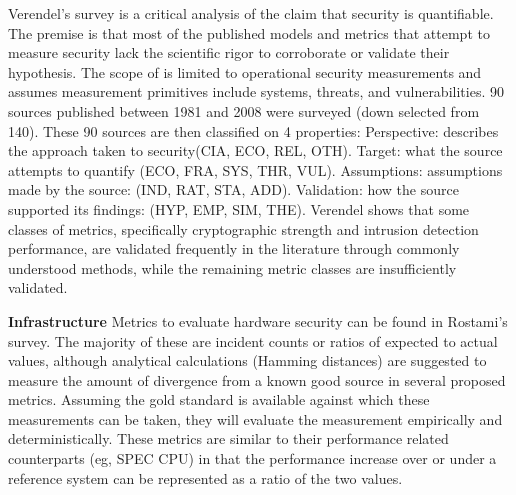 Verendel’s survey\cite{Verendel_2009} is a critical analysis of the claim that security is quantifiable. The premise is that most of the published models and metrics that attempt to measure security lack the scientific rigor to corroborate or validate their hypothesis. 
The scope of \cite{Verendel_2009} is limited to operational security measurements and assumes measurement primitives include systems, threats, and vulnerabilities. 90 sources published between 1981 and 2008 were surveyed (down selected from 140). These 90 sources are then classified on 4 properties: Perspective: describes the approach taken to security(CIA, ECO, REL, OTH). Target: what the source attempts to quantify (ECO, FRA, SYS, THR, VUL). Assumptions: assumptions made by the source: (IND, RAT, STA, ADD). Validation: how the source supported its findings: (HYP, EMP, SIM, THE).
Verendel shows that some classes of metrics, specifically cryptographic strength and intrusion detection performance, are validated frequently in the literature through commonly understood methods, while the remaining metric classes are insufficiently validated. 


\textbf{Infrastructure} Metrics to evaluate hardware security can be found in Rostami’s survey\cite{Rostami_2013, Rostami_Koushanfar_Karri_2014}. The majority of these are incident counts or ratios of expected to actual values, although analytical calculations (Hamming distances) are suggested to measure the amount of divergence from a known good source in several proposed metrics. Assuming the gold standard is available against which these measurements can be taken, they will evaluate the measurement empirically and deterministically. These metrics are similar to their performance related counterparts (eg, SPEC CPU) in that the performance increase over or under a reference system can be represented as a ratio of the two values. 

